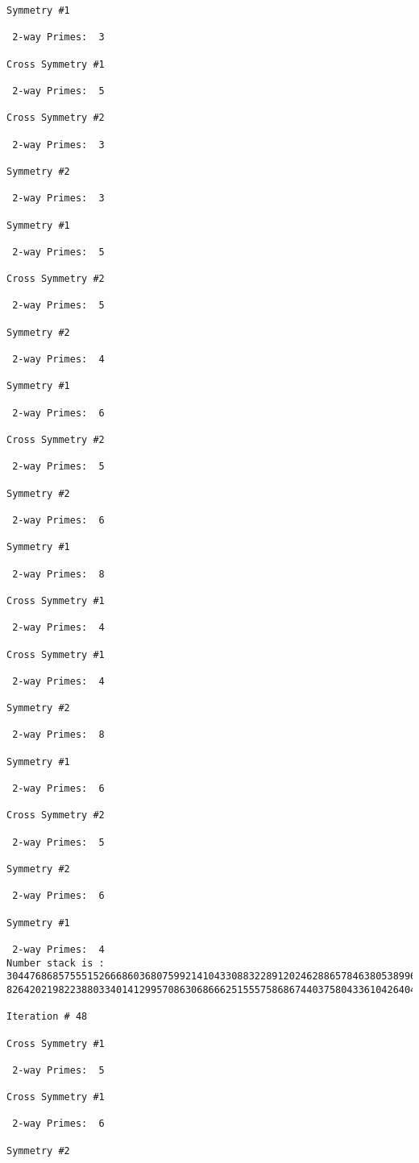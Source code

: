\begin{verbatim}
Symmetry #1

 2-way Primes: 	3

Cross Symmetry #1

 2-way Primes: 	5

Cross Symmetry #2

 2-way Primes: 	3

Symmetry #2

 2-way Primes: 	3

Symmetry #1

 2-way Primes: 	5

Cross Symmetry #2

 2-way Primes: 	5

Symmetry #2

 2-way Primes: 	4

Symmetry #1

 2-way Primes: 	6

Cross Symmetry #2

 2-way Primes: 	5

Symmetry #2

 2-way Primes: 	6

Symmetry #1

 2-way Primes: 	8

Cross Symmetry #1

 2-way Primes: 	4

Cross Symmetry #1

 2-way Primes: 	4

Symmetry #2

 2-way Primes: 	8

Symmetry #1

 2-way Primes: 	6

Cross Symmetry #2

 2-way Primes: 	5

Symmetry #2

 2-way Primes: 	6

Symmetry #1

 2-way Primes: 	4
Number stack is :
30447686857555152666860368075992141043308832289120246288657846380538996794608835958544046240163340857
82642021982238803340141299570863068666251555758686744037580433610426404458595388064976998350836487568

Iteration #	48

Cross Symmetry #1

 2-way Primes: 	5

Cross Symmetry #1

 2-way Primes: 	6

Symmetry #2


\end{verbatim}
